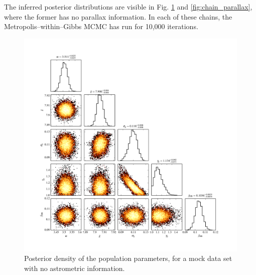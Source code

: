 \documentclass[fleqn,usenatbib]{mnras}
\begin{document}
The inferred posterior distributions are visible in Fig. \ref{fig:chain} and \ref{fig:chain_parallax}, where the former has no parallax information. In each of these chains, the Metropolis--within--Gibbs MCMC has run for 10,000 iterations.

\begin{figure}
	\includegraphics[width=1.\textwidth]{toy_chain.pdf}
    \caption{Posterior density of the population parameters, for a mock data set with no astrometric information.}
    \label{fig:chain}
\end{figure}
\end{document}
